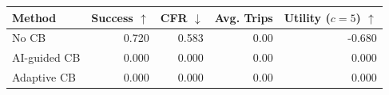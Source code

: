 \begin{tabular}{lrrrr}
\toprule
Method & Success $\uparrow$ & CFR $\downarrow$ & Avg. Trips & Utility ($c=5$) $\uparrow$ \\
\midrule
No CB & 0.720 & 0.583 & 0.00 & -0.680 \\
AI-guided CB & 0.000 & 0.000 & 0.00 & 0.000 \\
Adaptive CB & 0.000 & 0.000 & 0.00 & 0.000 \\
\bottomrule
\end{tabular}
